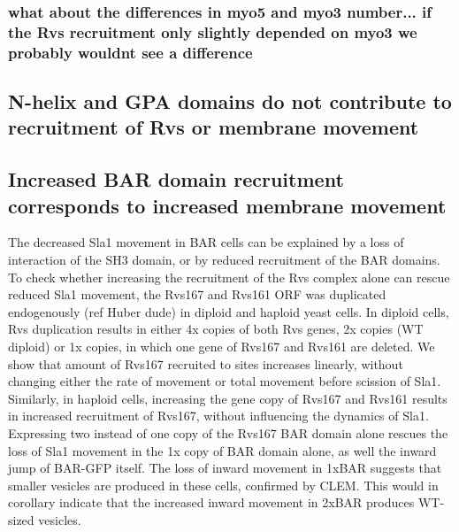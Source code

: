 \documentclass[9pt,lineno]{elife}
\begin{document}
\subsubsection{\color{red} 
	what about the differences in myo5 and myo3 number... if the Rvs recruitment only slightly depended on myo3 we probably wouldnt see a difference
}

\subsection{N-helix and GPA domains do not contribute to recruitment of Rvs or membrane movement}
\lipsum[12]
	
\subsection{Increased BAR domain recruitment corresponds to increased membrane movement}
The decreased Sla1 movement in BAR cells can be explained by a loss of interaction of the SH3 domain, or by reduced recruitment of the  BAR domains. To check whether increasing the recruitment of the Rvs complex alone can rescue reduced Sla1 movement, the Rvs167 and Rvs161 ORF was duplicated endogenously (ref Huber dude) in diploid and haploid yeast cells. In diploid cells, Rvs duplication results in either 4x copies of both Rvs genes, 2x copies (WT diploid) or 1x copies, in which one gene of Rvs167 and Rvs161 are deleted. We show that amount of Rvs167 recruited to sites increases linearly, without changing either the rate of movement or total movement before scission of Sla1. 
Similarly, in haploid cells, increasing the gene copy of Rvs167 and Rvs161 results in increased recruitment of Rvs167, without influencing the dynamics of Sla1. Expressing two instead of one copy of the Rvs167 BAR domain alone rescues the loss of Sla1 movement in the 1x copy of BAR domain alone, as well the inward jump of BAR-GFP itself. The loss of inward movement in 1xBAR suggests that smaller vesicles are produced in these cells, confirmed by CLEM. This would in corollary indicate that the increased inward movement in 2xBAR produces WT-sized vesicles. 
\end{document}
